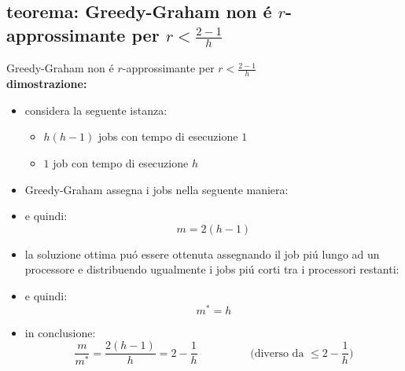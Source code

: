 \subsection*{teorema: Greedy-Graham non \'e $r$-approssimante per $r<\frac{2-1}{h}$}
\begin{flushleft}
	Greedy-Graham non \'e $r$-approssimante per $r<\frac{2-1}{h}$ \newline \\
	\vspace{0.5cm}
	\textbf{dimostrazione:}
	\begin{itemize}
		\item considera la seguente istanza:
		\begin{itemize}
			\item $h(h-1)$ jobs con tempo di esecuzione $1$
			\item $1$ job con tempo di esecuzione $h$
		\end{itemize}
		\item Greedy-Graham assegna i jobs nella seguente maniera:
		\item e quindi: $$m=2(h-1)$$
		\item la soluzione ottima pu\'o essere ottenuta assegnando il job pi\'u lungo ad un processore e distribuendo ugualmente i jobs pi\'u corti tra i processori restanti:
		\item e quindi: $$m^*=h$$
		\item in conclusione:
			$$\frac{m}{m^*}=\frac{2(h-1)}{h}=2-\frac{1}{h}\hspace{2cm}\text{(diverso da }\leq 2-\frac{1}{h}\text{)}$$
	\end{itemize}
\end{flushleft}


